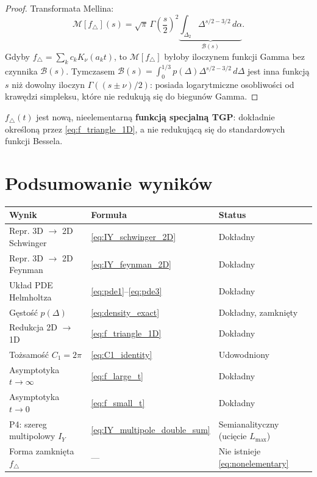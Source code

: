 \documentclass[11pt,a4paper]{article}
\newcommand{\Dt}{\Delta}
\begin{document}
\begin{proof}
Transformata Mellina:
\begin{equation}
\label{eq:nonelementary}
\mathcal{M}[f_\triangle](s)
= \sqrt\pi\,\Gamma\!\left(\frac{s}{2}\right)^2
\underbrace{\int_{\Delta_2}\Dt^{s/2-3/2}\,d\alpha}_{\mathcal{B}(s)}.
\end{equation}
Gdyby $f_\triangle=\sum_k c_k K_\nu(a_k t)$, to $\mathcal{M}[f_\triangle]$
by\l{}oby iloczynem funkcji Gamma bez czynnika $\mathcal{B}(s)$.
Tymczasem $\mathcal{B}(s)=\int_0^{1/3}p(\Dt)\Dt^{s/2-3/2}\,d\Dt$
jest inna{} funkcj\k{a} $s$ ni\.{z} dowolny iloczyn $\Gamma((s\pm\nu)/2)$:
posiada logarytmiczne osobliwo\'sci od kraw\k{e}dzi simpleksu,
kt\'ore nie redukuj\k{a} si\k{e} do biegun\'ow Gamma.
\end{proof}

$f_\triangle(t)$ jest nową, nieelementarną \textbf{funkcją specjalną TGP}:
dok\l{}adnie okre\'slon\k{a} przez \eqref{eq:f_triangle_1D},
a nie redukuj\k{a}c\k{a} si\k{e} do standardowych funkcji Bessela.

\section{Podsumowanie wynik\'ow}
\label{sec:summary}

\begin{center}
\renewcommand{\arraystretch}{1.3}
\begin{tabular}{@{}lll@{}}
\toprule
Wynik & Formu\l{}a & Status \\
\midrule
Repr. 3D $\to$ 2D Schwinger & \eqref{eq:IY_schwinger_2D} & Dok\l{}adny \\
Repr. 3D $\to$ 2D Feynman   & \eqref{eq:IY_feynman_2D}  & Dok\l{}adny \\
Uk\l{}ad PDE Helmholtza     & \eqref{eq:pde1}--\eqref{eq:pde3} & Dok\l{}adny \\
G\k{e}sto\'s\'c $p(\Dt)$  & \eqref{eq:density_exact}  & Dok\l{}adny, zamkni\k{e}ty \\
Redukcja 2D $\to$ 1D        & \eqref{eq:f_triangle_1D}  & Dok\l{}adny \\
To\.{z}samo\'s\'c $C_1=2\pi$& \eqref{eq:C1_identity}    & Udowodniony \\
Asymptotyka $t\to\infty$    & \eqref{eq:f_large_t}      & Dok\l{}adny \\
Asymptotyka $t\to 0$        & \eqref{eq:f_small_t}      & Dok\l{}adny \\
P4: szereg multipolowy $I_Y$ & \eqref{eq:IY_multipole_double_sum} & Semianalityczny (uci\k{e}cie $L_{\max}$) \\
Forma zamkni\k{e}ta $f_\triangle$ & ---              & Nie istnieje \eqref{eq:nonelementary} \\
\bottomrule
\end{tabular}
\end{center}
\end{document}
